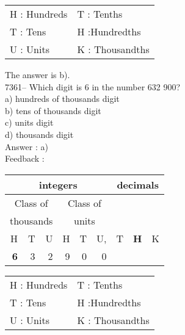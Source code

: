 \documentclass[letterpaper, 12pt]{article}
\begin{document}
\scriptsize
\begin{center}
\begin{tabular}{ll}
H : Hundreds & T\up{th} : Tenths\\
T : Tens & H\up{th} :Hundredths\\
U : Units & K\up{e} : Thousandths\\
\end{tabular}
\end{center}

\normalsize
The answer is b).\\



7361-- Which digit is 6 in the number 632 900?\\

a) hundreds of thousands digit\\
b) tens of thousands digit\\
c) units digit\\
d) thousands digit\\

Answer : a)\\

Feedback :\\
\begin{center}
\begin{tabular}{|rrr|rrr|rrr|}
\hline
\multicolumn{6}{|c|}{integers} &\multicolumn{3}{|c|}{decimals} \\
\hline
\multicolumn{3}{|c|}{Class of} &\multicolumn{3}{|c|}{Class of} &  \multicolumn{3}{c|}{} \\
\multicolumn{3}{|c|}{thousands} &\multicolumn{3}{|c|}{units} &  \multicolumn{3}{c|}{} \\
\hline
H & T & U &H & T & U, & T\up{th} & \textbf{H\up{th}} & K\up{th} \\
\hline
\hline
 \textbf{6} & 3 & 2 & 9 & 0 & 0 & & & \\
\hline
\end{tabular}
\end{center}

\scriptsize
\begin{center}
\begin{tabular}{ll}
H : Hundreds & T\up{th} : Tenths\\
T : Tens & H\up{th} :Hundredths\\
U : Units & K\up{e} : Thousandths\\
\end{tabular}
\end{center}
\end{document}
